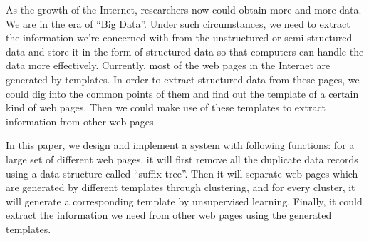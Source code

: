 
\begin{eabstract} 
  As the growth of the Internet, researchers now could obtain more and more
  data. We are in the era of ``Big Data''. Under such circumstances, we need to
  extract the information we're concerned with from the unstructured or
  semi-structured data and store it in the form of structured data so that
  computers can handle the data more effectively. Currently, most of the web
  pages in the Internet are generated by templates. In order to extract
  structured data from these pages, we could dig into the common points of them
  and find out the template of a certain kind of web pages. Then we could make
  use of these templates to extract information from other web pages.

  In this paper, we design and implement a system with following functions: for
  a large set of different web pages, it will first remove all the duplicate
  data records using a data structure called ``suffix tree''. Then it will
  separate web pages which are generated by different templates through
  clustering, and for every cluster, it will generate a corresponding template
  by unsupervised learning. Finally, it could extract the information we need
  from other web pages using the generated templates.
\end{eabstract}

